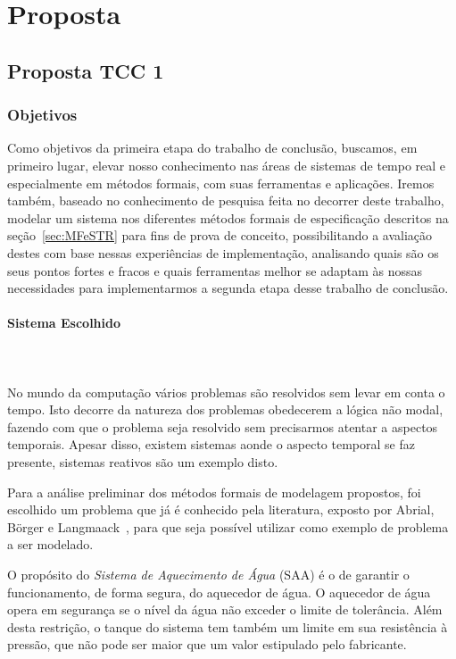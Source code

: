 \section{Proposta}
\subsection{Proposta TCC 1}
\subsubsection{Objetivos}
Como objetivos da primeira etapa do trabalho de conclusão, buscamos, em primeiro lugar,
elevar nosso conhecimento nas áreas de sistemas de tempo real e especialmente
em métodos formais, com suas ferramentas e aplicações. Iremos também,
baseado no conhecimento de pesquisa feita no decorrer deste trabalho, modelar um sistema
nos diferentes métodos formais de especificação descritos na seção~\ref{sec:MFeSTR} para fins de
prova de conceito, possibilitando a avaliação destes com base nessas experiências de implementação,
analisando quais são os seus pontos fortes e fracos e quais ferramentas melhor se adaptam às nossas
necessidades para implementarmos a segunda etapa desse trabalho de conclusão.
\\

\paragraph{Sistema Escolhido}\mbox{} \\\\
No mundo da computação vários problemas são resolvidos sem levar em conta o tempo.
Isto decorre da natureza dos problemas obedecerem a lógica não modal, fazendo com que o
problema seja resolvido sem precisarmos atentar a aspectos temporais. Apesar disso,
existem sistemas aonde o aspecto temporal se faz presente, sistemas reativos são um exemplo disto.

Para a análise preliminar dos métodos formais de modelagem propostos, foi escolhido um problema que
já é conhecido pela literatura, exposto por Abrial, B\"{o}rger e Langmaack~\cite{opac-b1092561},
para que seja possível utilizar como exemplo de problema a ser modelado.

O propósito do \textit{Sistema de Aquecimento de Água} (SAA) é o de garantir o funcionamento,
de forma segura, do aquecedor de água. O aquecedor de água opera em segurança se o nível da água
não exceder o limite de tolerância. Além desta restrição, o tanque do sistema tem também
um limite em sua resistência à pressão, que não pode ser maior que um valor estipulado pelo fabricante.

